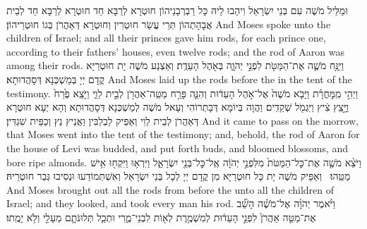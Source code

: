 {וּמַלֵּיל מֹשֶׁה עִם בְּנֵי יִשְׂרָאֵל וִיהַבוּ לֵיהּ כָּל רַבְרְבָנֵיהוֹן חוּטְרָא לְרַבָּא חַד חוּטְרָא לְרַבָּא חַד לְבֵית אֲבָהָתְהוֹן תְּרֵי עֲשַׂר חוּטְרִין וְחוּטְרָא דְּאַהֲרֹן בְּגוֹ חוּטְרֵיהוֹן׃}
{And Moses spoke unto the children of Israel; and all their princes gave him rods, for each prince one, according to their fathers’ houses, even twelve rods; and the rod of Aaron was among their rods.}{}
{וַיַּנַּ֥ח מֹשֶׁ֛ה אֶת־הַמַּטֹּ֖ת לִפְנֵ֣י יְהֹוָ֑ה בְּאֹ֖הֶל הָעֵדֻֽת׃}
{וְאַצְנַע מֹשֶׁה יָת חוּטְרַיָּא קֳדָם יְיָ בְּמַשְׁכְּנָא דְּסָהֲדוּתָא׃}
{And Moses laid up the rods before the \lord\space in the tent of the testimony.}{}
{וַיְהִ֣י מִֽמׇּחֳרָ֗ת וַיָּבֹ֤א מֹשֶׁה֙ אֶל־אֹ֣הֶל הָעֵד֔וּת וְהִנֵּ֛ה פָּרַ֥ח מַטֵּֽה־אַהֲרֹ֖ן לְבֵ֣ית לֵוִ֑י וַיֹּ֤צֵֽא פֶ֙רַח֙ וַיָּ֣צֵֽץ צִ֔יץ וַיִּגְמֹ֖ל שְׁקֵדִֽים׃
}
{וַהֲוָה בְּיוֹמָא דְּבָתְרוֹהִי וְעָאל מֹשֶׁה לְמַשְׁכְּנָא דְּסָהֲדוּתָא וְהָא יְעָא חוּטְרָא דְּאַהֲרֹן לְבֵית לֵוִי וְאַפֵּיק לַבְלַבִּין וַאֲנֵיץ נַץ וְכַפֵּית שִׁגְדִּין׃}
{And it came to pass on the morrow, that Moses went into the tent of the testimony; and, behold, the rod of Aaron for the house of Levi was budded, and put forth buds, and bloomed blossoms, and bore ripe almonds.}{}
{וַיֹּצֵ֨א מֹשֶׁ֤ה אֶת־כׇּל־הַמַּטֹּת֙ מִלִּפְנֵ֣י יְהֹוָ֔ה אֶֽל־כׇּל־בְּנֵ֖י יִשְׂרָאֵ֑ל וַיִּרְא֥וּ וַיִּקְח֖וּ אִ֥ישׁ מַטֵּֽהוּ׃ \petucha }
{וְאַפֵּיק מֹשֶׁה יָת כָּל חוּטְרַיָּא מִן קֳדָם יְיָ לְכָל בְּנֵי יִשְׂרָאֵל וְאִשְׁתְּמוֹדַעוּ וּנְסִיבוּ גְּבַר חוּטְרֵיהּ׃}
{And Moses brought out all the rods from before the \lord\space unto all the children of Israel; and they looked, and took every man his rod.}{}
{וַיֹּ֨אמֶר יְהֹוָ֜ה אֶל־מֹשֶׁ֗ה הָשֵׁ֞ב אֶת־מַטֵּ֤ה אַהֲרֹן֙ לִפְנֵ֣י הָעֵד֔וּת לְמִשְׁמֶ֥רֶת לְא֖וֹת לִבְנֵי־מֶ֑רִי וּתְכַ֧ל תְּלוּנֹּתָ֛ם מֵעָלַ֖י וְלֹ֥א יָמֻֽתוּ׃
}

